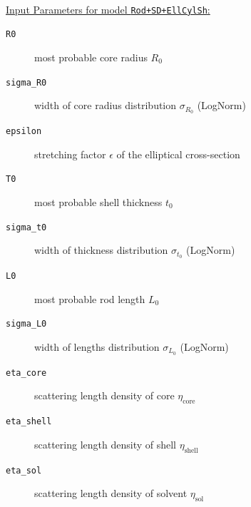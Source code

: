 \hspace{1pt}\\
\uline{Input Parameters for model \texttt{Rod+SD+EllCylSh}:}\\
\begin{description}
\item[\texttt{R0}] most probable core radius $R_0$
\item[\texttt{sigma\_R0}] width of core radius distribution $\sigma_{R_0}$  (LogNorm)
\item[\texttt{epsilon}] stretching factor $\epsilon$ of the elliptical cross-section
\item[\texttt{T0}] most probable shell thickness $t_0$
\item[\texttt{sigma\_t0}] width of thickness distribution $\sigma_{t_0}$ (LogNorm)
\item[\texttt{L0}] most probable rod length $L_0$
\item[\texttt{sigma\_L0}] width of lengths distribution $\sigma_{L_0}$ (LogNorm)
\item[\texttt{eta\_core}] scattering length density of core $\eta_\mathrm{core}$
\item[\texttt{eta\_shell}] scattering length density of shell $\eta_\mathrm{shell}$
\item[\texttt{eta\_sol}] scattering length density of solvent $\eta_\mathrm{sol}$
\end{description}
